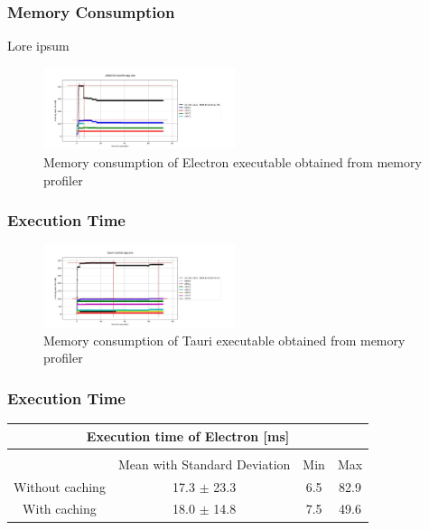 \subsubsection{Memory Consumption}
\label{subsubsec:perf:memory}

Lore ipsum \\
\begin{figure}[ht]
    \centering
    \includegraphics[width=0.5\textwidth]{images/ElectronMemCons.jpeg}
    \caption[Bla]{Memory consumption of Electron executable obtained from memory profiler}
    \label{fig:electron:memory}
\end{figure}
\subsubsection{Execution Time}

\begin{figure}[ht]
    \centering
    \includegraphics[width=0.5\textwidth]{images/TauriMemCons.jpeg}
    \caption[Bla]{Memory consumption of Tauri executable obtained from memory profiler}
    \label{fig:tauri:memory}
\end{figure}
\subsubsection{Execution Time}
\label{subsubsec:perf:execution}

\begin{tabular} {| c | c | c | c |}

    \hline
    \multicolumn{4}{|c|}{Execution time of Electron [ms]} \\ \hline
     \multicolumn{4}{|c|}{}\\ \hline
     & Mean with Standard Deviation & Min & Max     \\ \hline
    Without caching & 17.3 $\pm$ 23.3 & 6.5 & 82.9  \\ \hline
    With caching & 18.0 $\pm$ 14.8 & 7.5 & 49.6 \\ \hline

\end{tabular} \\ \\


